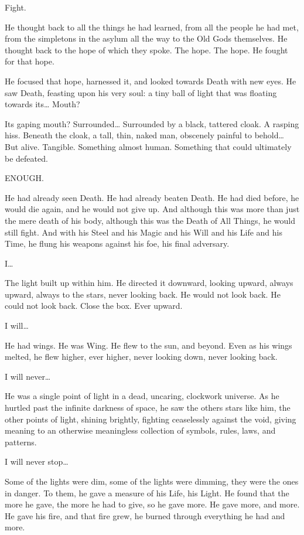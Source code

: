Fight.

He thought back to all the things he had learned, from all the people he had met, from the simpletons in the asylum all the way to the Old Gods themselves. He thought back to the hope of which they spoke. The hope. The hope. He fought for that hope.

He focused that hope, harnessed it, and looked towards Death with new eyes. He saw Death, feasting upon his very soul: a tiny ball of light that was floating towards its… Mouth?

Its gaping mouth? Surrounded… Surrounded by a black, tattered cloak. A rasping hiss. Beneath the cloak, a tall, thin, naked man, obscenely painful to behold… But alive. Tangible. Something almost human. Something that could ultimately be defeated.

ENOUGH.

He had already seen Death. He had already beaten Death. He had died before, he would die again, and he would not give up. And although this was more than just the mere death of his body, although this was the Death of All Things, he would still fight. And with his Steel and his Magic and his Will and his Life and his Time, he flung his weapons against his foe, his final adversary.

I…

The light built up within him. He directed it downward, looking upward, always upward, always to the stars, never looking back. He would not look back. He could not look back. Close the box. Ever upward.

I will…

He had wings. He was Wing. He flew to the sun, and beyond. Even as his wings melted, he flew higher, ever higher, never looking down, never looking back.

I will never…

He was a single point of light in a dead, uncaring, clockwork universe. As he hurtled past the infinite darkness of space, he saw the others stars like him, the other points of light, shining brightly, fighting ceaselessly against the void, giving meaning to an otherwise meaningless collection of symbols, rules, laws, and patterns.

I will never stop…

Some of the lights were dim, some of the lights were dimming, they were the ones in danger. To them, he gave a measure of his Life, his Light. He found that the more he gave, the more he had to give, so he gave more. He gave more, and more. He gave his fire, and that fire grew, he burned through everything he had and more.

